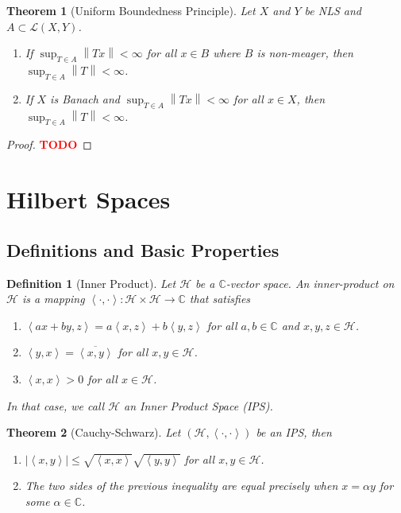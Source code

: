 \documentclass{article}
\newtheorem*{theorem}{Theorem}
\newtheorem*{definition}{Definition}
\newcommand{\C}{\mathbb{C}}
\renewcommand{\H}{\mathcal{H}}
\renewcommand{\L}{\mathcal{L}}
\newcommand{\inner}[2]{\left\langle#1 , #2 \right\rangle}
\newcommand{\norm}[1]{\left\lVert#1 \right\rVert}
\newcommand{\td}{\textcolor{red}{\textbf{TODO}}}
\begin{document}
\begin{theorem}[Uniform Boundedness Principle]
    Let $X$ and $Y$ be NLS and $A \subset \L(X,Y)$.
    \begin{enumerate}[label=(\alph*)]
        \item If $\sup_{T \in A}\norm{Tx} < \infty$ for all $x \in B$ where $B$ is non-meager, then $\sup_{T\in A}\norm{T} < \infty$.
        \item If $X$ is Banach and $\sup_{T \in A}\norm{Tx} < \infty$ for all $x \in X$, then $\sup_{T\in A}\norm{T} < \infty$.
    \end{enumerate}
\end{theorem}

\begin{proof}
    \td 
\end{proof}

\section{Hilbert Spaces}

\subsection{Definitions and Basic Properties}

\begin{definition}[Inner Product]
    Let $\H$ be a $\C$-vector space. An inner-product on $\H$ is a mapping $\inner{\cdot}{\cdot} : \H \times \H \to \C$ that satisfies
    \begin{enumerate}
        \item $\inner{ax+by}{z} = a\inner{x}{z} + b\inner{y}{z}$ for all $a,b \in \C$ and $x,y,z \in \H$.
        \item $\inner{y}{x} = \overline{\inner{x}{y}}$ for all $x,y \in \H$.
        \item $\inner{x}{x} > 0$ for all $x \in \H$.
    \end{enumerate}
    In that case, we call $\H$ an Inner Product Space (IPS).
\end{definition}

\begin{theorem}[Cauchy-Schwarz]
    Let $(\H, \inner{\cdot}{\cdot})$ be an IPS, then
    \begin{enumerate}[label=(\alph*)]
        \item $|\inner{x}{y}| \leq \sqrt{\inner{x}{x}} \sqrt{\inner{y}{y}}$ for all $x,y \in \H$.
        \item The two sides of the previous inequality are equal precisely when $x = \alpha y$ for some $\alpha \in \C$.
    \end{enumerate}
\end{theorem}
\end{document}
